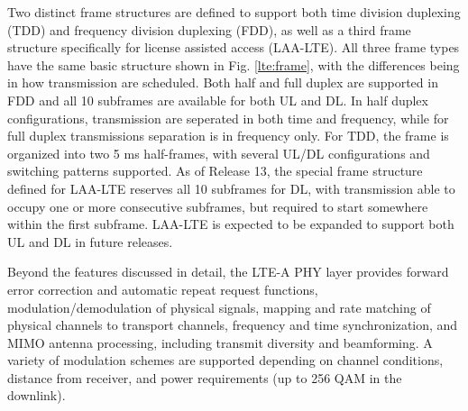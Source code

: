 Two distinct frame structures are defined to support both time division duplexing (TDD) and frequency division duplexing (FDD), as well as a third frame structure specifically for license assisted access (LAA-LTE).  All three frame types have the same basic structure shown in Fig. \ref{lte:frame}, with the differences being in how transmission are scheduled.  Both half and full duplex are supported in FDD and all 10 subframes are available for both UL and DL.  In half duplex configurations, transmission are seperated in both time and frequency, while for full duplex transmissions separation is in frequency only.  For TDD, the frame is organized into two 5 ms half-frames, with several UL/DL configurations and switching patterns supported.  As of Release 13, the special frame structure defined for LAA-LTE reserves all 10 subframes for DL, with transmission able to occupy one or more consecutive subframes, but required to start somewhere within the first subframe. LAA-LTE is expected to be expanded to support both UL and DL in future releases.

Beyond the features discussed in detail, the LTE-A PHY layer provides forward error correction and automatic repeat request functions, modulation/demodulation of physical signals, mapping and rate matching of physical channels to transport channels, frequency and time synchronization, and MIMO antenna processing, including transmit diversity and beamforming.  A variety of modulation schemes are supported depending on channel conditions, distance from receiver, and power requirements (up to 256 QAM in the downlink).  

